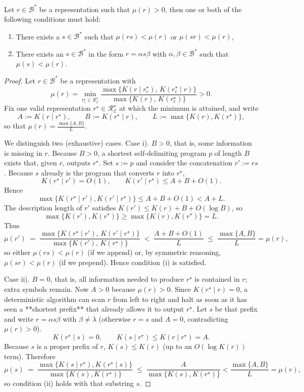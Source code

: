 \begin{theorem}
\label{th:reduce_miscoding}
Let $r \in \mathcal{B}^\ast$ be a representation such that $\mu(r) >0$, then one or both of the following conditions must hold:
\begin{enumerate}[label=(\roman*)]
\item There exists a $s \in \mathcal{B}^\ast$ such that $\mu(rs) < \mu(r)$ or $\mu(sr) < \mu(r)$,
\item There exists an $s \in \mathcal{B}^\ast$ in the form $r = \alpha s \beta$ with $\alpha, \beta \in \mathcal{B}^\ast$ such that $\mu(s) < \mu(r)$.
\end{enumerate}
\end{theorem}
\begin{proof}
Let $r\in\mathcal B^{\ast}$ be a representation with
\[
\mu(r)=
\min_{r_{e}^{\star}\in\mathcal R^{\star}_{\mathcal E}}
\frac{\max\{K(r\mid r_{e}^{\star}),\,K(r_{e}^{\star}\mid r)\}}
     {\max\{K(r),\,K(r_{e}^{\star})\}}
>0 .
\]
Fix one valid representation
$r^{\star}\in\mathcal R^{\star}_{\mathcal E}$ at which the minimum is attained, and write
\[
A:=K(r\mid r^{\star}),\qquad
B:=K(r^{\star}\mid r),\qquad
L:=\max\{K(r),K(r^{\star})\},
\]
so that $\mu(r)=\frac{\max\{A,B\}}{L}$.

We distinguish two (exhaustive) cases. Case i).  $B>0$, that is, some information is missing in $r$. Because $B>0$, a shortest self-delimiting program $p$ of length $B$ exists that, given $r$, outputs $r^{\star}$.
Set $s:=p$ and consider the concatenation $r':=rs$. Because $s$ already is the program that converts $r$ into $r^{\star}$,
\[
K(r^{\star}\mid r')=O(1),\qquad
K(r'\mid r^{\star})\le A+B+O(1).
\]
Hence
\[
\max\{K(r^{\star}\mid r'),K(r'\mid r^{\star})\}\le A+B+O(1)<A+L .
\]
The description length of $r'$ satisfies $K(r')\le K(r)+B+O(\log B)$, so
\[
\max\{K(r'),K(r^{\star})\}\ge
\max\{K(r),K(r^{\star})\}=L .
\]
Thus
\[
\mu(r')\;=\;
\frac{\max\{K(r^{\star}\mid r'),\,K(r'\mid r^{\star})\}}
     {\max\{K(r'),\,K(r^{\star})\}}
\;<\;
\frac{A+B+O(1)}{L}
\;\le\;
\frac{\max\{A,B\}}{L}
=\mu(r),
\]
so either $\mu(rs)<\mu(r)$ (if we append) or, by symmetric reasoning, $\mu(sr)<\mu(r)$ (if we prepend).
Hence condition (i) is satisfied.

Case ii). $B=0$, that is, all information needed to produce $r^{\star}$ is contained in $r$; extra symbols remain. Now $A>0$ because $\mu(r)>0$. Since $K(r^{\star}\mid r)=0$, a deterministic algorithm can scan $r$ from left to right and halt as soon as it has seen a **shortest prefix** that already allows it to output $r^{\star}$.
Let $s$ be that prefix and write $r=\alpha s\beta$ with $\beta\ne\lambda$ (otherwise $r=s$ and $A=0$, contradicting $\mu(r)>0$).
\[
K(r^{\star}\mid s)=0,\qquad
K(s\mid r^{\star})\le K(r\mid r^{\star})=A .
\]
Because $s$ is a proper prefix of $r$, $K(s)\le K(r)$ (up to an $O(\log K(r))$ term). Therefore
\[
\mu(s)\;=\;
\frac{\max\{K(s\mid r^{\star}),K(r^{\star}\mid s)\}}
     {\max\{K(s),K(r^{\star})\}}
\;\le\;
\frac{A}{\max\{K(s),K(r^{\star})\}}
<
\frac{\max\{A,B\}}{L}
=\mu(r),
\]
so condition (ii) holds with that substring $s$.
\end{proof}

